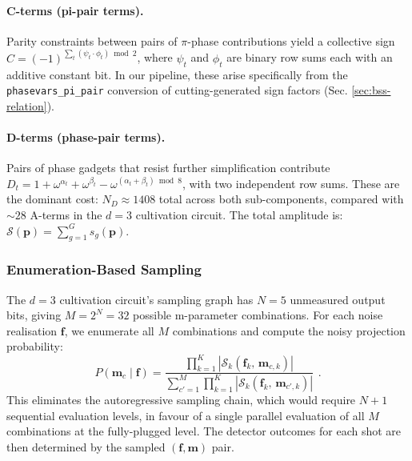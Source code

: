 \documentclass[a4paper,onecolumn,11pt,accepted=2026-06-10]{quantumarticle}
\begin{document}
\paragraph{C-terms (pi-pair terms).}
Parity constraints between pairs of $\pi$-phase contributions yield a
collective sign $C = (-1)^{\sum_t (\psi_t \cdot \phi_t) \bmod 2}$, where
$\psi_t$ and $\phi_t$ are binary row sums each with an additive constant
bit. In our pipeline, these arise specifically from the
\texttt{phasevars\_pi\_pair} conversion of cutting-generated sign factors
(Sec. \ref{sec:bss-relation}).

\paragraph{D-terms (phase-pair terms).}
Pairs of phase gadgets that resist further simplification contribute
$D_t = 1 + \omega^{\alpha_t} + \omega^{\beta_t}
     - \omega^{(\alpha_t + \beta_t) \bmod 8}$,
with two independent row sums. These are the dominant cost:
$N_D \approx 1408$ total across both sub-components, compared with
${\sim}28$ A-terms in the $d=3$ cultivation circuit. The total amplitude is: $\displaystyle\mathcal{S}(\mathbf{p}) = \sum_{g=1}^{G} s_g(\mathbf{p})$.

\subsubsection{Enumeration-Based Sampling}
\label{sec:enumeration}

The $d=3$ cultivation circuit's sampling graph has $N = 5$ unmeasured output bits, giving $M = 2^N = 32$ possible m-parameter combinations. For each noise realisation $\mathbf{f}$, we enumerate all $M$ combinations and compute the noisy
projection probability:
\begin{equation}
\label{eq:sampling-prob}
    P(\mathbf{m}_c \mid \mathbf{f})
    = \frac{\displaystyle\prod_{k=1}^{K} |\mathcal{S}_k(\mathbf{f}_k,\, \mathbf{m}_{c,k})|}
           {\displaystyle \sum_{c'=1}^{M} \prod_{k=1}^{K}
            |\mathcal{S}_k(\mathbf{f}_k,\, \mathbf{m}_{c',k})|}\, \ .
\end{equation}
This eliminates the autoregressive sampling chain, which would require $N+1$ sequential evaluation levels, in favour of a single parallel evaluation of all $M$ combinations at the fully-plugged level. The detector outcomes for each shot are then determined by the sampled $(\mathbf{f}, \mathbf{m})$ pair.
\end{document}
